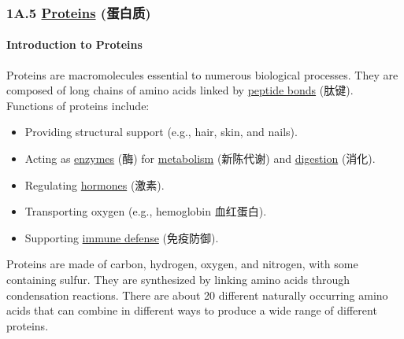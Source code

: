 
\subsubsection{1A.5 \underline{Proteins} (蛋白质)}
\paragraph{Introduction to Proteins} Proteins are macromolecules essential to numerous biological processes. They are composed of
long chains of amino acids linked by \underline{peptide bonds} (肽键). Functions of proteins include:
\begin{itemize}
    \item Providing structural support (e.g., hair, skin, and nails).
    \item Acting as \underline{enzymes} (酶) for \underline{metabolism} (新陈代谢) and \underline{digestion} (消化).
    \item Regulating \underline{hormones} (激素).
    \item Transporting oxygen (e.g., hemoglobin 血红蛋白).
    \item Supporting \underline{immune defense} (免疫防御).
\end{itemize}
Proteins are made of carbon, hydrogen, oxygen, and nitrogen, with some containing sulfur. They are synthesized by linking amino
acids through condensation reactions. There are about 20 different naturally occurring amino acids that can combine in different
ways to produce a wide range of different proteins.

